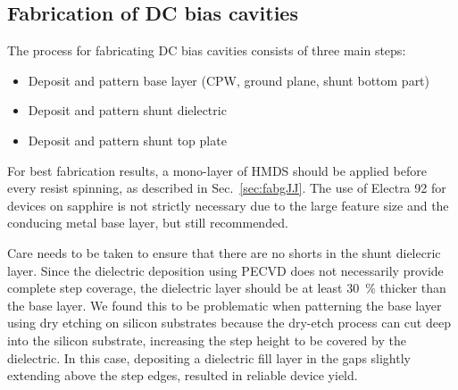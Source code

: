 \subsection{Fabrication of DC bias cavities}\label{sec:fabRF}

The process for fabricating DC bias cavities consists of three main steps:
\begin{itemize}
	\item Deposit and pattern base layer (CPW, ground plane, shunt bottom part)
	\item Deposit and pattern shunt dielectric
	\item Deposit and pattern shunt top plate
\end{itemize}
%
For best fabrication results, a mono-layer of HMDS should be applied before every resist spinning, as described in Sec.~\ref{sec:fabgJJ}.
%
The use of Electra 92 for devices on sapphire is not strictly necessary due to the large feature size and the conducing metal base layer, but still recommended.

Care needs to be taken to ensure that there are no shorts in the shunt dielecric layer.
%
Since the dielectric deposition using PECVD does not necessarily provide complete step coverage, the dielectric layer should be at least \SI{30}{\percent} thicker than the base layer.
%
We found this to be problematic when patterning the base layer using dry etching on silicon substrates because the dry-etch process can cut deep into the silicon substrate, increasing the step height to be covered by the dielectric.
%
In this case, depositing a dielectric fill layer in the gaps slightly extending above the step edges, resulted in reliable device yield.



